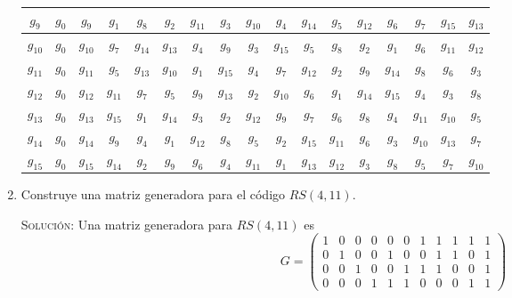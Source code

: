 \documentclass[letterpaper,10pt]{article}
\begin{document}
\begin{enumerate}
\begin{table}[h]
\begin{center}
\begin{tabular}{|c|c|c|c|c|c|c|c|c|c|c|c|c|c|c|c|c|}
    $g_{9}$ & $g_{0}$ & $g_{9}$ & $g_{1}$ & $g_{8}$ & $g_{2}$ & $g_{11}$ & 
    $g_{3}$ & $g_{10}$ & $g_{4}$ & $g_{14}$ & $g_{5}$ & $g_{12}$ & $g_{6}$ & 
    $g_{7}$ & $g_{15}$ & $g_{13}$ \\ \hline
    $g_{10}$ & $g_{0}$ & $g_{10}$ & $g_{7}$ & $g_{14}$ & $g_{13}$ & $g_{4}$ & 
    $g_{9}$ & $g_{3}$ & $g_{15}$ & $g_{5}$ & $g_{8}$ & $g_{2}$ & $g_{1}$ & 
    $g_{6}$ & $g_{11}$ & $g_{12}$ \\ \hline
    $g_{11}$ & $g_{0}$ & $g_{11}$ & $g_{5}$ & $g_{13}$ & $g_{10}$ & $g_{1}$ & 
    $g_{15}$ & $g_{4}$ & $g_{7}$ & $g_{12}$ & $g_{2}$ & $g_{9}$ & $g_{14}$ &
    $g_{8}$ & $g_{6}$ & $g_{3}$ \\ \hline
    $g_{12}$ & $g_{0}$ & $g_{12}$ & $g_{11}$ & $g_{7}$ & $g_{5}$ & $g_{9}$ & 
    $g_{13}$ & $g_{2}$ & $g_{10}$ & $g_{6}$ & $g_{1}$ & $g_{14}$ & $g_{15}$ & 
    $g_{4}$ & $g_{3}$ & $g_{8}$ \\ \hline
    $g_{13}$ & $g_{0}$ & $g_{13}$ & $g_{15}$ & $g_{1}$ & $g_{14}$ & $g_{3}$ & 
    $g_{2}$ & $g_{12}$ & $g_{9}$ & $g_{7}$ & $g_{6}$ & $g_{8}$ & $g_{4}$ & 
    $g_{11}$ & $g_{10}$ & $g_{5}$ \\ \hline
    $g_{14}$ & $g_{0}$ & $g_{14}$ & $g_{9}$ & $g_{4}$ & $g_{1}$ & $g_{12}$ & 
    $g_{8}$ & $g_{5}$ & $g_{2}$ & $g_{15}$ & $g_{11}$ & $g_{6}$ & $g_{3}$ & 
    $g_{10}$ & $g_{13}$ & $g_{7}$  \\ \hline
    $g_{15}$ & $g_{0}$ & $g_{15}$ & $g_{14}$ & $g_{2}$ & $g_{9}$ & $g_{6}$ & 
    $g_{4}$ & $g_{11}$ & $g_{1}$ & $g_{13}$ & $g_{12}$ & $g_{3}$ & $g_{8}$ & 
    $g_{5}$ & $g_{7}$ & $g_{10}$  \\ \hline
    \end{tabular}
    \end{center}
    \end{table}
    
    \item Construye una matriz generadora para el código $RS(4,11)$. 
    
    \textsc{Solución:} Una matriz generadora para $RS(4, 11)$ es 
    \begin{equation*}
        G = 
        \begin{pmatrix}
        1 & 0 & 0 & 0 & 0 & 0 & 1 & 1 & 1 & 1 & 1\\
        0 & 1 & 0 & 0 & 1 & 0 & 0 & 1 & 1 & 0 & 1\\
        0 & 0 & 1 & 0 & 0 & 1 & 1 & 1 & 0 & 0 & 1\\
        0 & 0 & 0 & 1 & 1 & 1 & 0 & 0 & 0 & 1 & 1
        \end{pmatrix}
    \end{equation*}
    

\end{enumerate}
\end{document}
